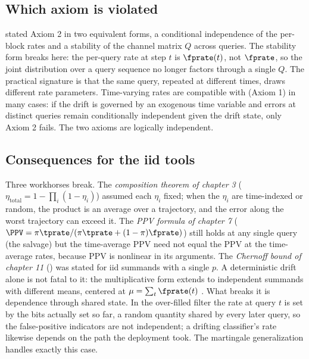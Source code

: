 \subsection*{Which axiom is violated}

 stated Axiom 2 in two equivalent forms, a conditional
independence of the per-block rates and a stability of the channel matrix
$Q$ across queries. The stability form breaks here: the per-query rate at
step $t$ is $\fprate(t)$, not $\fprate$, so the joint distribution over a
query sequence no longer factors through a single $Q$. The practical
signature is that the same query, repeated at different times, draws
different rate parameters. Time-varying rates are compatible with
 (Axiom 1) in many cases: if the drift is governed
by an exogenous time variable and errors at distinct queries remain
conditionally independent given the drift state, only Axiom 2 fails. The
two axioms are logically independent.

\subsection*{Consequences for the iid tools}

Three workhorses break. The \emph{composition theorem of chapter 3}
($\eta_{\text{total}} = 1 - \prod_i (1 - \eta_i)$) assumed each $\eta_i$
fixed; when the $\eta_i$ are time-indexed or random, the product is an
average over a trajectory, and the error along the worst trajectory can
exceed it. The \emph{PPV formula of chapter 7} ($\PPV = \pi \tprate /
(\pi \tprate + (1 - \pi) \fprate)$) still holds at any single query (the
 salvage) but the time-average PPV need
not equal the PPV at the time-average rates, because PPV is nonlinear in
its arguments. The \emph{Chernoff bound of chapter 11}
() was stated for iid summands with a single $p$. A
deterministic drift alone is not fatal to it: the multiplicative form
extends to independent summands with different means, centered at $\mu =
\sum_t \fprate(t)$ \parencite{mitzenmacher-upfal}. What breaks it is
dependence through shared state. In the over-filled filter the rate at
query $t$ is set by the bits actually set so far, a random quantity
shared by every later query, so the false-positive indicators are not
independent; a drifting classifier's rate likewise depends on the path
the deployment took. The martingale generalization handles exactly this
case.

